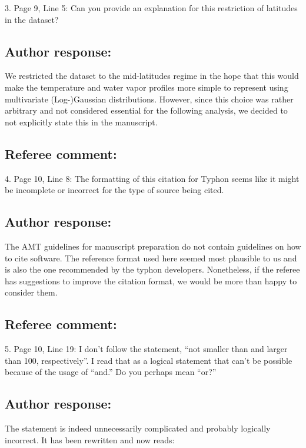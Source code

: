 \documentclass[journal abbreviation, manuscript]{copernicus}
\begin{document}
3. Page 9, Line 5: Can you provide an explanation for this restriction of latitudes in the
dataset?
\subsection*{Author response:}

We restricted the dataset to the mid-latitudes regime in the hope that this
would make the temperature and water vapor profiles more simple to represent
using multivariate (Log-)Gaussian distributions. However, since this choice
was rather arbitrary and not considered essential for the following analysis,
we decided to not explicitly state this in the manuscript.

\subsection*{Referee comment:}

4.  Page 10, Line 8:  The formatting of this citation for Typhon seems like it might be
incomplete or incorrect for the type of source being cited.

\subsection*{Author response:}

The AMT guidelines for manuscript preparation do not contain guidelines on how to
cite software. The reference format used here seemed most plausible to us and
is also the one recommended by the typhon developers. Nonetheless, if the referee
has suggestions to improve the citation format, we would be more than happy to
consider them.

\subsection*{Referee comment:}

5. Page 10, Line 19: I don’t follow the statement, “not smaller than and larger than 100,
respectively”.  I read that as a logical statement that can’t be possible because of the
usage of “and.” Do you perhaps mean “or?”

\subsection*{Author response:}

The statement is indeed unnecessarily complicated and probably logically incorrect. It has been
rewritten and now reads:
\end{document}
